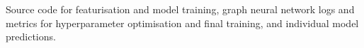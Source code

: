 \documentclass[journal=jcisd8,manuscript=article]{achemso}
\begin{document}




\begin{suppinfo}

    Source code for featurisation and model training, graph neural network logs
    and metrics for hyperparameter optimisation and final training, and
    individual model predictions.

\end{suppinfo}


\end{document}
